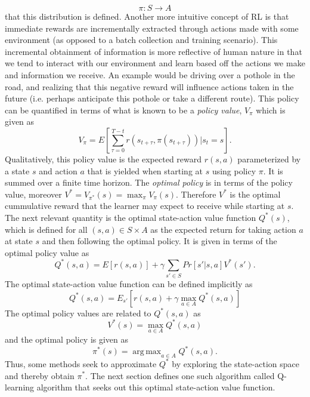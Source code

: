 \documentclass{article} %
\DeclareMathOperator*{\argmax}{arg\,max}
\begin{document}
$$
\pi : S \rightarrow A
$$
that this distribution is defined. Another more intuitive concept of RL is that immediate rewards are incrementally extracted through actions made with some environment (as opposed to a batch collection and training scenario). This incremental obtainment of information is more reflective of human nature in that we tend to interact with our environment and learn based off the actions we make and information we receive. An example would be driving over a pothole in the road, and realizing that this negative reward will influence actions taken in the future (i.e. perhaps anticipate this pothole or take a different route). This policy can be quantified in terms of what is known to be a \textit{policy value}, $V_{\pi}$ which is given as 
$$
V_{\pi} = E[\sum_{\tau = 0}^{T-t}r(s_{t+\tau},\pi(s_{t+\tau}))|s_t = s].
$$
Qualitatively, this policy value is the expected reward $r(s,a)$ parameterized by a state $s$ and action $a$ that is yielded when starting at $s$ using policy $\pi$. It is summed over a finite time horizon. The \textit{optimal policy} is in terms of the policy value, moreover $V^{*}=V_{\pi^*}(s) = \max_{\pi} V_{\pi}(s)$. Therefore $V^{*}$ is the optimal cummulative reward that the learner may expect to receive while starting at $s$. The next relevant quantity is the optimal state-action value function $Q^*(s)$, which is defined for all $(s,a) \in S \times A$ as the expected return for taking action $a$ at state $s$ and then following the optimal policy.  It is given in terms of the optimal policy value as
$$
Q^*(s,a) = E[r(s,a)] + \gamma \sum_{s' \in S}Pr[s' | s,a]V^*(s').
$$
The optimal state-action value function can be defined implicitly as
$$
Q^*(s,a) = E_{s'}[r(s,a) + \gamma \max_{a \in A}Q^*(s,a)]
$$
The optimal policy values are related to $Q^*(s,a)$ as 
$$V^*(s) = \max_{a\in A} Q^*(s,a)$$
and the optimal policy is given as 
$$\pi^*(s) = \argmax_{a\in A} Q^*(s,a).$$
Thus, some methods seek to approximate $Q^*$ by exploring the state-action space and thereby obtain $\pi^*$.
The next section defines one such algorithm called Q-learning algorithm that seeks out this optimal state-action value function. 
\end{document}
